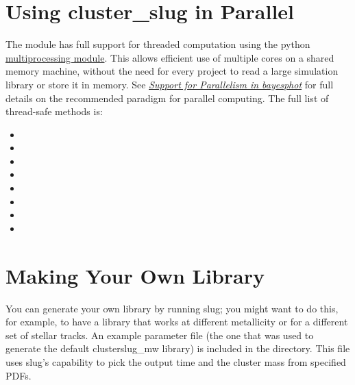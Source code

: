 \documentclass[letterpaper,10pt,english]{sphinxmanual}
\begin{document}
\section{Using cluster\_slug in Parallel}
\label{cluster_slug:using-cluster-slug-in-parallel}
The  module has full support for threaded computation using the python \href{https://docs.python.org/2.7/library/multiprocessing.html}{multiprocessing module}. This allows efficient use of multiple cores on a shared memory machine, without the need for every project to read a large simulation library or store it in memory. See {\hyperref[bayesphot:ssec-bayesphot-threading]{\emph{Support for Parallelism in bayesphot}}} for full details on the recommended paradigm for parallel computing. The full list of thread-safe  methods is:
\begin{itemize}
\item {} 

\item {} 

\item {} 

\item {} 

\item {} 

\item {} 

\item {} 

\item {} 

\end{itemize}


\section{Making Your Own Library}
\label{cluster_slug:making-your-own-library}
You can generate your own library by running slug; you might want to do this, for example, to have a library that works at different metallicity or for a different set of stellar tracks. An example parameter file (the one that was used to generate the default clusterslug\_mw library) is included in the  directory. This file uses slug's capability to pick the output time and the cluster mass from specified PDFs.
\end{document}
